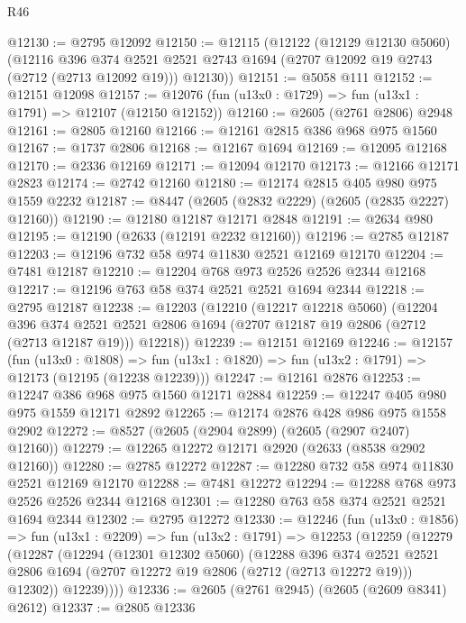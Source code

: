 \begin{lexlean}{R46}
\begin{coremodule}
@12130 := @2795 @12092
@12150 := @12115
    (@12122
      (@12129 @12130 @5060)
      (@12116
        @396
        @374
        @2521
        @2521
        @2743
        @1694
        (@2707 @12092 @19 @2743 (@2712 (@2713 @12092 @19)))
        @12130))
@12151 := @5058 @111
@12152 := @12151 @12098
@12157 := @12076 (fun (u13x0 : @1729) => fun (u13x1 : @1791) => @12107 (@12150 @12152))
@12160 := @2605 (@2761 @2806) @2948
@12161 := @2805 @12160
@12166 := @12161 @2815 @386 @968 @975 @1560
@12167 := @1737 @2806
@12168 := @12167 @1694
@12169 := @12095 @12168
@12170 := @2336 @12169
@12171 := @12094 @12170
@12173 := @12166 @12171 @2823
@12174 := @2742 @12160
@12180 := @12174 @2815 @405 @980 @975 @1559 @2232
@12187 := @8447 (@2605 (@2832 @2229) (@2605 (@2835 @2227) @12160))
@12190 := @12180 @12187 @12171 @2848
@12191 := @2634 @980
@12195 := @12190 (@2633 (@12191 @2232 @12160))
@12196 := @2785 @12187
@12203 := @12196 @732 @58 @974 @11830 @2521 @12169 @12170
@12204 := @7481 @12187
@12210 := @12204 @768 @973 @2526 @2526 @2344 @12168
@12217 := @12196 @763 @58 @374 @2521 @2521 @1694 @2344
@12218 := @2795 @12187
@12238 := @12203
    (@12210
      (@12217 @12218 @5060)
      (@12204
        @396
        @374
        @2521
        @2521
        @2806
        @1694
        (@2707 @12187 @19 @2806 (@2712 (@2713 @12187 @19)))
        @12218))
@12239 := @12151 @12169
@12246 := @12157
    (fun (u13x0 : @1808) =>
    fun (u13x1 : @1820) => fun (u13x2 : @1791) => @12173 (@12195 (@12238 @12239)))
@12247 := @12161 @2876
@12253 := @12247 @386 @968 @975 @1560 @12171 @2884
@12259 := @12247 @405 @980 @975 @1559 @12171 @2892
@12265 := @12174 @2876 @428 @986 @975 @1558 @2902
@12272 := @8527 (@2605 (@2904 @2899) (@2605 (@2907 @2407) @12160))
@12279 := @12265 @12272 @12171 @2920 (@2633 (@8538 @2902 @12160))
@12280 := @2785 @12272
@12287 := @12280 @732 @58 @974 @11830 @2521 @12169 @12170
@12288 := @7481 @12272
@12294 := @12288 @768 @973 @2526 @2526 @2344 @12168
@12301 := @12280 @763 @58 @374 @2521 @2521 @1694 @2344
@12302 := @2795 @12272
@12330 := @12246
    (fun (u13x0 : @1856) =>
    fun (u13x1 : @2209) =>
    fun (u13x2 : @1791) =>
    @12253
      (@12259
        (@12279
          (@12287
            (@12294
              (@12301 @12302 @5060)
              (@12288
                @396
                @374
                @2521
                @2521
                @2806
                @1694
                (@2707 @12272 @19 @2806 (@2712 (@2713 @12272 @19)))
                @12302))
            @12239))))
@12336 := @2605 (@2761 @2945) (@2605 (@2609 @8341) @2612)
@12337 := @2805 @12336

\end{coremodule}
\end{lexlean}
